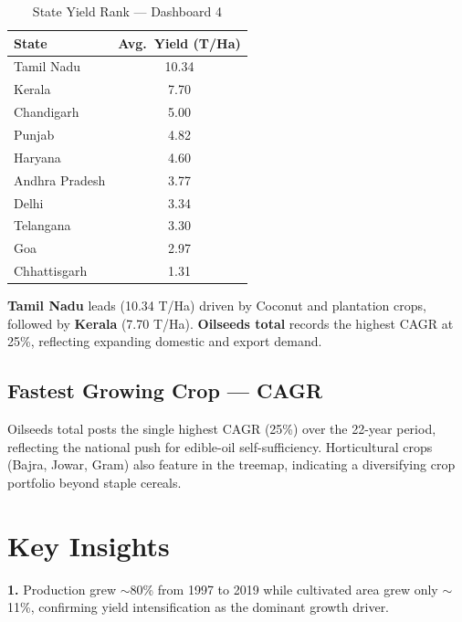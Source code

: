 \documentclass[10pt]{article}
\begin{document}
\begin{table}[H]
  \centering
  \caption{State Yield Rank — Dashboard 4}
  \label{tab:stateyield4}
  \small
  \begin{tabular}{lc}
    \toprule
    \textbf{State} & \textbf{Avg.\ Yield (T/Ha)} \\
    \midrule
    Tamil Nadu     & 10.34 \\
    Kerala         &  7.70 \\
    Chandigarh     &  5.00 \\
    Punjab         &  4.82 \\
    Haryana        &  4.60 \\
    Andhra Pradesh &  3.77 \\
    Delhi          &  3.34 \\
    Telangana      &  3.30 \\
    Goa            &  2.97 \\
    Chhattisgarh   &  1.31 \\
    \bottomrule
  \end{tabular}
\end{table}

\textbf{Tamil Nadu} leads (10.34 T/Ha) driven by Coconut and plantation crops,
followed by \textbf{Kerala} (7.70 T/Ha). \textbf{Oilseeds total} records the
highest CAGR at 25\%, reflecting expanding domestic and export demand.

\subsection{Fastest Growing Crop — CAGR}
Oilseeds total posts the single highest CAGR (25\%) over the 22-year period,
reflecting the national push for edible-oil self-sufficiency. Horticultural
crops (Bajra, Jowar, Gram) also feature in the treemap, indicating a
diversifying crop portfolio beyond staple cereals.

\section{Key Insights}

\begin{insightbox}
  \textbf{1.} Production grew $\sim$80\% from 1997 to 2019 while cultivated area
  grew only $\sim$11\%, confirming yield intensification as the dominant growth driver.
\end{insightbox}
\end{document}
